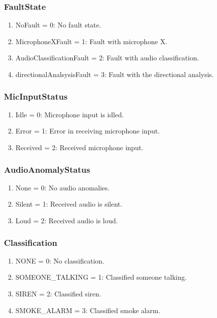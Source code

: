 \documentclass[12pt, titlepage]{article}
\begin{document}
\subsubsection{FaultState}\label{enum:FaultState}
\begin{enumerate}
  \item NoFault = 0: \label{enum:FaultState:NoFault} No fault state.
  \item MicrophoneXFault = 1: \label{enum:FaultState:MicFault} Fault with
  microphone X.
  \item AudioClassificationFault = 2:
    \label{enum:FaultState:ClassificationFault}
    Fault with audio classification.
  \item directionalAnalsysisFault = 3: \label{enum:FaultState:DOAFault}
    Fault with the directional analysis.
\end{enumerate}

\subsubsection{MicInputStatus}\label{enum:MicInputStatus}
\begin{enumerate}
  \item Idle =  0: \label{enum:MicInputStatus:Idle} Microphone input is idled.
  \item Error = 1: \label{enum:MicInputStatus:Error} Error in receiving
  microphone input.
  \item Received = 2: \label{enum:MicInputStatus:Received}
    Received microphone input.
\end{enumerate}

\subsubsection{AudioAnomalyStatus}\label{enum:AudioAnomalyStatus}
\begin{enumerate}
  \item None = 0: \label{enum:AudioAnomalyStatus:None} No audio anomalies. 
  \item Silent = 1: \label{enum:AudioAnomalyStatus:Silent} Received audio is silent.
  \item Loud = 2: \label{enum:AudioAnomalyStatus:Loud} Received audio is loud.
\end{enumerate}

\subsubsection{Classification}\label{enum:Classification}
\begin{enumerate}
  \item NONE = 0: \label{enum:Classification:None} No classification.
  \item SOMEONE_TALKING = 1: \label{enum:Classification:SomeoneTalking} 
  Classified someone talking. 
  \item SIREN = 2: \label{enum:Classification:Siren} Classified siren. 
  \item SMOKE_ALARM = 3: \label{enum:Classification:SmokeAlarm} 
  Classified smoke alarm.
\end{enumerate}
\end{document}
